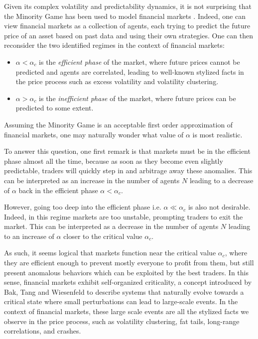 \documentclass[a4paper, amsfonts, amssymb, amsmath, reprint, showkeys, nofootinbib, twoside]{revtex4-1}
\begin{document}
Given its complex volatility and predictability dynamics, it is not surprising that the Minority Game has been used to model financial markets \cite{Challet_2004}. Indeed, one can view financial markets as a collection of agents, each trying to predict the future price of an asset based on past data and using their own strategies. One can then reconsider the two identified regimes in the context of financial markets:
\begin{itemize}
    \item $\alpha < \alpha_c$ is the \textit{efficient phase} of the market, where future prices cannot be predicted and agents are correlated, leading to well-known stylized facts in the price process such as excess volatility and volatility clustering.
    \item $\alpha > \alpha_c$ is the \textit{inefficient phase} of the market, where future prices can be predicted to some extent.
\end{itemize}
Assuming the Minority Game is an acceptable first order approximation of financial markets, one may naturally wonder what value of $\alpha$ is most realistic.

To answer this question, one first remark is that markets must be in the efficient phase almost all the time, because as soon as they become even slightly predictable, traders will quickly step in and arbitrage away these anomalies. This can be interpreted as an increase in the number of agents $N$ leading to a decrease of $\alpha$ back in the efficient phase $\alpha < \alpha_c$.

However, going too deep into the efficient phase i.e. $\alpha \ll \alpha_c$ is also not desirable. Indeed, in this regime markets are too unstable, prompting traders to exit the market. This can be interpreted as a decrease in the number of agents $N$ leading to an increase of $\alpha$ closer to the critical value $\alpha_c$.

As such, it seems logical that markets function near the critical value $\alpha_c$, where they are efficient enough to prevent mostly everyone to profit from them, but still present anomalous behaviors which can be exploited by the best traders. In this sense, financial markets exhibit self-organized criticality, a concept introduced by Bak, Tang and Wiesenfeld \cite{Bak_1987} to describe systems that naturally evolve towards a critical state where small perturbations can lead to large-scale events. In the context of financial markets, these large scale events are all the stylized facts we observe in the price process, such as volatility clustering, fat tails, long-range correlations, and crashes.


\end{document}
